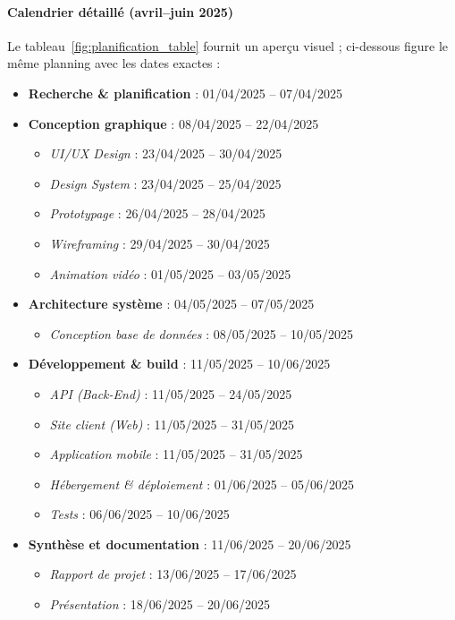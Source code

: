     \paragraph{Calendrier détaillé (avril–juin 2025)}
Le tableau~\ref{fig:planification_table} fournit un aperçu visuel ; ci-dessous figure le même planning avec les dates exactes :

\begin{itemize}
  \item \textbf{Recherche \& planification} : 01/04/2025 – 07/04/2025
  \item \textbf{Conception graphique} : 08/04/2025 – 22/04/2025
    \begin{itemize}
      \item \textit{UI/UX Design} : 23/04/2025 – 30/04/2025
      \item \textit{Design System} : 23/04/2025 – 25/04/2025
      \item \textit{Prototypage} : 26/04/2025 – 28/04/2025
      \item \textit{Wireframing} : 29/04/2025 – 30/04/2025
      \item \textit{Animation vidéo} : 01/05/2025 – 03/05/2025
    \end{itemize}
  \item \textbf{Architecture système} : 04/05/2025 – 07/05/2025
    \begin{itemize}
      \item \textit{Conception base de données} : 08/05/2025 – 10/05/2025
    \end{itemize}
  \item \textbf{Développement \& build} : 11/05/2025 – 10/06/2025
    \begin{itemize}
      \item \textit{API (Back-End)} : 11/05/2025 – 24/05/2025
      \item \textit{Site client (Web)} : 11/05/2025 – 31/05/2025
      \item \textit{Application mobile} : 11/05/2025 – 31/05/2025
      \item \textit{Hébergement \& déploiement} : 01/06/2025 – 05/06/2025
      \item \textit{Tests} : 06/06/2025 – 10/06/2025
    \end{itemize}
  \item \textbf{Synthèse et documentation} : 11/06/2025 – 20/06/2025
    \begin{itemize}
      \item \textit{Rapport de projet} : 13/06/2025 – 17/06/2025
      \item \textit{Présentation} : 18/06/2025 – 20/06/2025
    \end{itemize}
\end{itemize}

